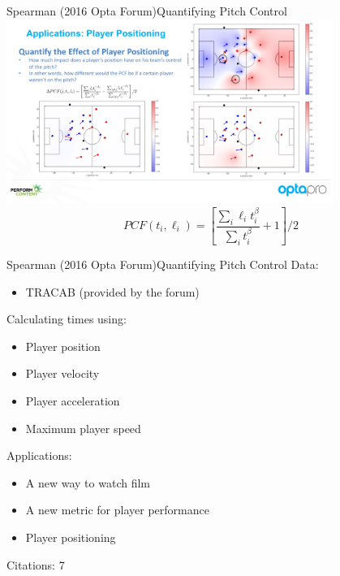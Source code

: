\documentclass{beamer}
\begin{document}
  \begin{frame}{Spearman (2016 Opta Forum)}{Quantifying Pitch Control}
    \centering
    \includegraphics[width=0.8\textwidth]{images/spearman_2016.pdf}
    $$
      PCF(t_i, \ell_i) = \left[\frac{\sum_i \ell_it_i^\beta}{\sum_i t_i^\beta} + 1\right] / 2
    $$
  \end{frame}

  \begin{frame}{Spearman (2016 Opta Forum)}{Quantifying Pitch Control}
    Data:
      \begin{itemize}
        \item TRACAB (provided by the forum)
      \end{itemize}
    Calculating times using:
    \begin{itemize}
      \item Player position
      \item Player velocity
      \item Player acceleration
      \item Maximum player speed
    \end{itemize}
    Applications:
    \begin{itemize}
      \item A new way to watch film
      \item A new metric for player performance
      \item Player positioning
    \end{itemize}
    Citations: 7
  \end{frame}
\end{document}
